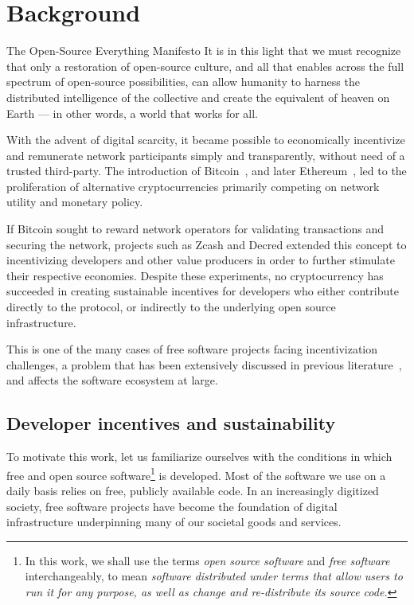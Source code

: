 \section{Background}

\begin{epigraph}{The Open-Source Everything Manifesto}
    \noindent It is in this light that we must recognize that only a restoration of
    open-source culture, and all that enables across the full spectrum of
    open-source possibilities, can allow humanity to harness the distributed
    intelligence of the collective and create the equivalent of heaven on Earth
    --- in other words, a world that works for all.
\end{epigraph}

\noindent With the advent of digital scarcity, it became possible to economically
incentivize and remunerate network participants simply and transparently,
without need of a trusted third-party. The introduction of
Bitcoin~\cite{bitcoin}, and later Ethereum~\cite{ethereum}, led to the
proliferation of alternative cryptocurrencies primarily competing on network
utility and monetary policy.

If Bitcoin sought to reward network operators for
validating transactions and securing the network, projects such as Zcash and
Decred extended this concept to incentivizing developers and other value producers
in order to further stimulate their respective economies. Despite these experiments,
no cryptocurrency has succeeded in creating sustainable incentives for
developers who either contribute directly to the protocol, or indirectly to the
underlying open source infrastructure.

This is one of the many cases of free software projects facing incentivization
challenges, a problem that has been extensively discussed in previous
literature~\cite{roads and bridges}, and affects the software ecosystem at large.

\subsection{Developer incentives and sustainability}
\label{s:incentives}

To motivate this work, let us familiarize ourselves with the
conditions in which free and open source software\footnote{In this work, we
shall use the terms \emph{open source software} and \emph{free software} interchangeably,
to mean \emph{software distributed under terms that allow users to run it
for any purpose, as well as change and re-distribute its source code.}}
is developed. Most of the software we use on a daily basis relies on free,
publicly available code. In an increasingly digitized society, free software
projects have become the foundation of digital infrastructure underpinning many
of our societal goods and services.

